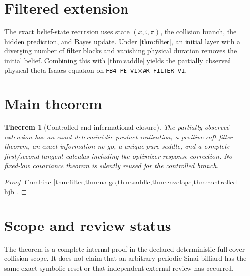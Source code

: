 \documentclass[11pt,reqno]{amsart}
\newtheorem{theorem}{Theorem}[section]
\theoremstyle{remark}
\begin{document}
\section{Filtered extension}
The exact belief-state recursion uses state $(x,i,\pi)$, the collision branch,
the hidden prediction, and Bayes update.  Under \cref{thm:filter}, an initial
layer with a diverging number of filter blocks and vanishing physical duration
removes the initial belief.  Combining this with \cref{thm:saddle} yields the
partially observed physical theta-Isaacs equation on
\texttt{FB4-PE-v1}$\times$\texttt{AR-FILTER-v1}.

\section{Main theorem}
\begin{theorem}[Controlled and informational closure]\label{thm:main}
The partially observed extension has an exact deterministic product
realization, a positive soft-filter theorem, an exact-information no-go, a
unique pure saddle, and a complete first/second tangent calculus including the
optimizer-response correction.  No fixed-law covariance theorem is silently
reused for the controlled branch.
\end{theorem}
\begin{proof}
Combine \cref{thm:filter,thm:no-go,thm:saddle,thm:envelope,thm:controlled-hjb}.
\end{proof}

\section*{Scope and review status}
The theorem is a complete internal proof in the declared deterministic
full-cover collision scope.  It does not claim that an arbitrary periodic
Sinai billiard has the same exact symbolic reset or that independent external
review has occurred.



\end{document}
